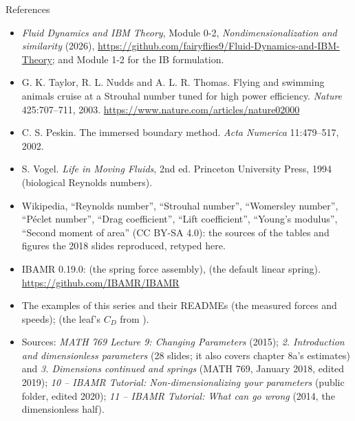 \documentclass[aspectratio=169,11pt]{beamer}
\begin{document}
\begin{frame}{References}
\label{fr:refs}
\scriptsize
\begin{itemize}
  \item \emph{Fluid Dynamics and IBM Theory}, Module 0-2, \emph{Nondimensionalization and similarity} (2026), \url{https://github.com/fairyflies9/Fluid-Dynamics-and-IBM-Theory}; and Module 1-2 for the IB formulation.
  \item G. K. Taylor, R. L. Nudds and A. L. R. Thomas. Flying and swimming animals cruise at a Strouhal number tuned for high power efficiency. \emph{Nature} 425:707--711, 2003. \url{https://www.nature.com/articles/nature02000}
  \item C. S. Peskin. The immersed boundary method. \emph{Acta Numerica} 11:479--517, 2002.
  \item S. Vogel. \emph{Life in Moving Fluids}, 2nd ed. Princeton University Press, 1994 (biological Reynolds numbers).
  \item Wikipedia, ``Reynolds number'', ``Strouhal number'', ``Womersley number'', ``P\'eclet number'', ``Drag coefficient'', ``Lift coefficient'', ``Young's modulus'', ``Second moment of area'' (CC BY-SA 4.0): the sources of the tables and figures the 2018 slides reproduced, retyped here.
  \item IBAMR 0.19.0:  (the spring force assembly),  (the default linear spring). \url{https://github.com/IBAMR/IBAMR}
  \item The examples of this series and their READMEs (the measured forces and speeds);  (the leaf's $C_D$ from ).
  \item Sources: \emph{MATH 769 Lecture 9: Changing Parameters} (2015); \emph{2. Introduction and dimensionless parameters} (28 slides; it also covers chapter 8a's estimates) and \emph{3. Dimensions continued and springs} (MATH 769, January 2018, edited 2019); \emph{10 -- IBAMR Tutorial: Non-dimensionalizing your parameters} (public folder, edited 2020); \emph{11 -- IBAMR Tutorial: What can go wrong} (2014, the dimensionless half).
\end{itemize}
\end{frame}
\end{document}
